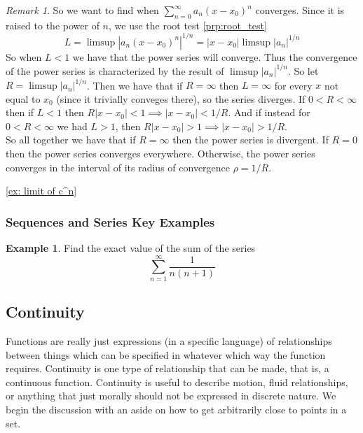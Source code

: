 \documentclass{article}
\theoremstyle{definition}
\newtheorem{example}{Example}[section]
\theoremstyle{remark}
\newtheorem{remark}{Remark}[section]
\begin{document}
\begin{remark}
So we want to find when $\sum_{n=0}^{\infty} a_n (x - x_0)^n$ converges. 
Since it is raised to the power of $n$, we use the root test \ref{prp:root_test}
\[
L = \limsup |a_n (x - x_0)^n|^{1/n} = |x-x_0|\limsup{|a_n|^{1/n}} 
\]
So when $L < 1$ we have that the power series will converge. Thus the convergence of 
the power series is characterized by the result of $\limsup{|a_n|^{1/n}}$. So let $R = \limsup{|a_n|^{1/n}}$.
Then we have that if $R = \infty$ then $L = \infty$ for every $x$ not equal to $x_0$ (since it trivially 
conveges there), so the series diverges. If $0 < R < \infty$ then if $L < 1$ then $R|x-x_0| < 1 \implies |x-x_0| < 1/R$.
And if instead for $0 < R < \infty$ we had $L>1$, then $R|x-x_0| > 1 \implies |x-x_0| > 1/R$.\\
So all together we have that if $R = \infty$ then the power series is divergent. If 
$R = 0$ then the power series converges everywhere. Otherwise, the power series converges in the interval 
of its radius of convergence $\rho = 1/R$.



\end{remark}


\ref{ex: limit of c^n}


\vspace{.5cm}

\subsubsection{Sequences and Series Key Examples}

\begin{example}
Find the exact value of the sum of the series
\[
\sum^\infty_{n=1}{\frac{1}{n(n+1)}}
\]
\end{example}


\vspace{.5cm}

\subsection{Continuity}
Functions are really just expressions (in a specific language) of relationships
between things which can be specified in whatever which way the function requires. 
Continuity is one type of relationship that can be made, that is, a continuous function. 
Continuity is useful to describe motion, fluid relationships, or anything that just 
morally should not be expressed in discrete nature. We begin the discussion with an aside on 
how to get arbitrarily close to points in a set.
\end{document}
